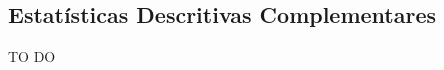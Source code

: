 \documentclass[
	12pt,				%
	openright,			%
	oneside,			%
	a4paper,			%
	english,			%
	french,				%
	spanish,			%
	brazil				%
	]{abntex2}
\begin{document}
\begin{anexosenv}

\partanexos

\chapter{Estatísticas Descritivas Complementares}

TO DO

\end{anexosenv}

\printindex
\end{document}
